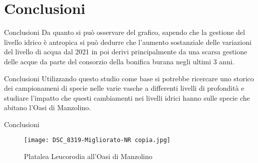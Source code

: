 \documentclass{beamer} %
\begin{document}
\section{Conclusioni}

        \begin{frame}{Conclusioni}
        Da quanto si può osservare del grafico, sapendo che la gestione del livello idrico è antropica si può dedurre che l'aumento sostanziale delle variazioni del livello di acqua dal 2021 in poi derivi principalmente da una scarsa gestione  delle acque da parte del consorzio della bonifica burana negli ultimi 3 anni.
        \end{frame}
\begin{frame}{Conclusioni}
    Utilizzando questo studio come base si potrebbe ricercare uno storico dei campionameni di specie nelle varie vasche a differenti livelli di profondità e studiare l'impatto che questi cambiamenti nei livelli idrici hanno sulle specie che abitano l'Oasi di Manzolino.
\end{frame}
\begin{frame}{Conclusioni}
    \begin{figure}
        \centering
        \texttt{[image: DSC\_8319-Migliorato-NR copia.jpg]}
        \caption{Platalea Leucorodia all'Oasi di Manzolino}
        \label{fig:enter-label}
    \end{figure}
\end{frame}
\end{document}
